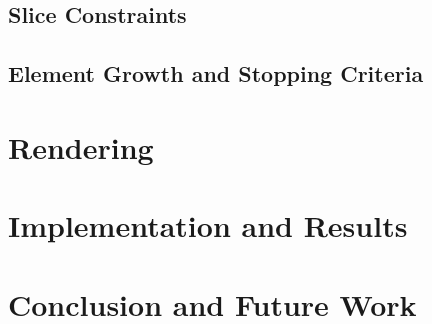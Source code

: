 \subsection{Slice Constraints}


\subsection{Element Growth and Stopping Criteria}


\section{Rendering}


\section{Implementation and Results}


\section{Conclusion and Future Work}


